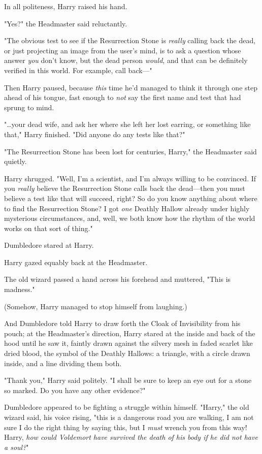 In all politeness, Harry raised his hand.

"Yes?" the Headmaster said reluctantly.

"The obvious test to see if the Resurrection Stone is \emph{really} calling
back the dead, or just projecting an image from the user’s mind, is to ask a
question whose answer \emph{you} don’t know, but the dead person \emph{would},
and that can be definitely verified in this world. For example, call back—"

Then Harry paused, because \emph{this} time he’d managed to think it through
one step ahead of his tongue, fast enough to \emph{not} say the first name and
test that had sprung to mind.

"…your dead wife, and ask her where she left her lost earring, or
something like that," Harry finished. "Did anyone do any tests like that?"

"The Resurrection Stone has been lost for centuries, Harry," the Headmaster
said quietly.

Harry shrugged. "Well, I’m a scientist, and I’m always willing to be convinced.
If you \emph{really} believe the Resurrection Stone calls back the dead—then
you must believe a test like that will succeed, right? So do you know anything
about where to find the Resurrection Stone? I got \emph{one} Deathly Hallow
already under highly mysterious circumstances, and, well, we both know how the
rhythm of the world works on that sort of thing."

Dumbledore stared at Harry.

Harry gazed equably back at the Headmaster.

The old wizard passed a hand across his forehead and muttered, "This is
madness."

(Somehow, Harry managed to stop himself from laughing.)

And Dumbledore told Harry to draw forth the Cloak of Invisibility from his
pouch; at the Headmaster’s direction, Harry stared at the inside and back of
the hood until he saw it, faintly drawn against the silvery mesh in faded
scarlet like dried blood, the symbol of the Deathly Hallows: a triangle, with a
circle drawn inside, and a line dividing them both.

"Thank you," Harry said politely. "I shall be sure to keep an eye out for a
stone so marked. Do you have any other evidence?"

Dumbledore appeared to be fighting a struggle within himself. "Harry," the old
wizard said, his voice rising, "this is a dangerous road you are walking, I am
not sure I do the right thing by saying this, but I \emph{must} wrench you from
this way! Harry, \emph{how could Voldemort have survived the death of his body
if he did not have a soul?}"

